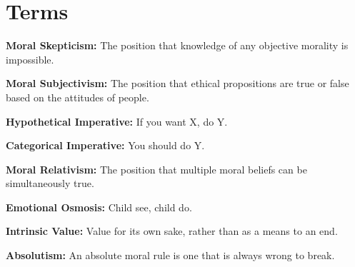 \documentclass[12pt]{article}
\begin{document}
\section{Terms}

\noindent

\textbf{Moral Skepticism:} The position that knowledge of any objective morality is impossible.

\textbf{Moral Subjectivism:} The position that ethical propositions are true or false based on the attitudes of people.

\textbf{Hypothetical Imperative:} If you want X, do Y.

\textbf{Categorical Imperative:} You should do Y.

\textbf{Moral Relativism:} The position that multiple moral beliefs can be simultaneously true.

\textbf{Emotional Osmosis:} Child see, child do.

\textbf{Intrinsic Value:} Value for its own sake, rather than as a means to an end.

\textbf{Absolutism:} An absolute moral rule is one that is always wrong to break.
\end{document}
